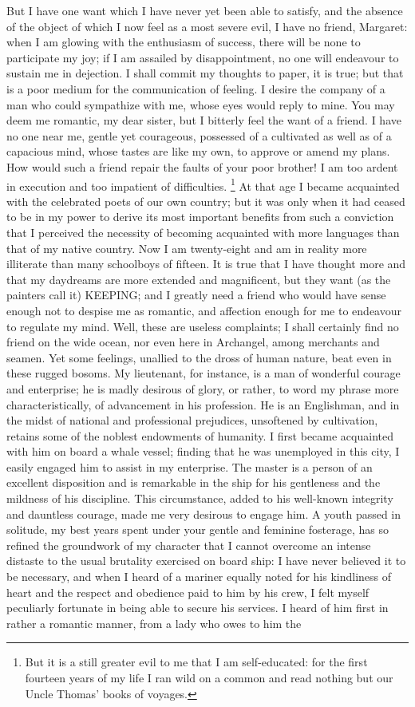 But I have one want which I have never yet been able to satisfy, and the absence of the object of which I now feel as a most severe evil, I have no friend, Margaret: when I am glowing with the enthusiasm of success, there will be none to participate my joy; if I am assailed by disappointment, no one will endeavour to sustain me in dejection. I shall commit my thoughts to paper, it is true; but that is a poor medium for the communication of feeling. I desire the company of a man who could sympathize with me, whose eyes would reply to mine. You may deem me romantic, my dear sister, but I bitterly feel the want of a friend. I have no one near me, gentle yet courageous, possessed of a cultivated as well as of a capacious mind, whose tastes are like my own, to approve or amend my plans. How would such a friend repair the faults of your poor brother! I am too ardent in execution and too impatient of difficulties. \footnote{But it is a still greater evil to me that I am self-educated: for the first fourteen years of my life I ran wild on a common and read nothing but our Uncle Thomas' books of voyages.} At that age I became acquainted with the celebrated poets of our own country; but it was only when it had ceased to be in my power to derive its most important benefits from such a conviction that I perceived the necessity of becoming acquainted with more languages than that of my native country. Now I am twenty-eight and am in reality more illiterate than many schoolboys of fifteen. It is true that I have thought more and that my daydreams are more extended and magnificent, but they want (as the painters call it) KEEPING; and I greatly need a friend who would have sense enough not to despise me as romantic, and affection enough for me to endeavour to regulate my mind. Well, these are useless complaints; I shall certainly find no friend on the wide ocean, nor even here in Archangel, among merchants and seamen. Yet some feelings, unallied to the dross of human nature, beat even in these rugged bosoms. My lieutenant, for instance, is a man of wonderful courage and enterprise; he is madly desirous of glory, or rather, to word my phrase more characteristically, of advancement in his profession. He is an Englishman, and in the midst of national and professional prejudices, unsoftened by cultivation, retains some of the noblest endowments of humanity. I first became acquainted with him on board a whale vessel; finding that he was unemployed in this city, I easily engaged him to assist in my enterprise. The master is a person of an excellent disposition and is remarkable in the ship for his gentleness and the mildness of his discipline. This circumstance, added to his well-known integrity and dauntless courage, made me very desirous to engage him. A youth passed in solitude, my best years spent under your gentle and feminine fosterage, has so refined the groundwork of my character that I cannot overcome an intense distaste to the usual brutality exercised on board ship: I have never believed it to be necessary, and when I heard of a mariner equally noted for his kindliness of heart and the respect and obedience paid to him by his crew, I felt myself peculiarly fortunate in being able to secure his services. I heard of him first in rather a romantic manner, from a lady who owes to him the 